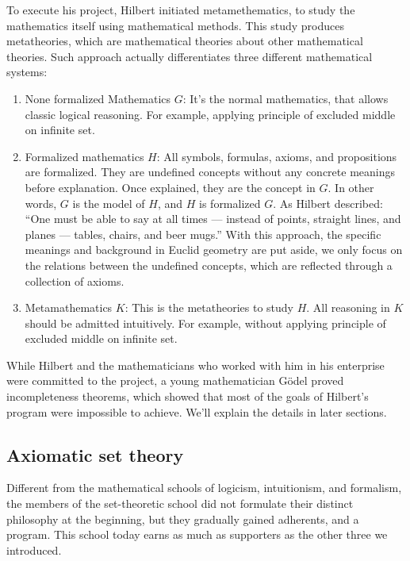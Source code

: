 \documentclass{article}
\begin{document}
To execute his project, Hilbert initiated metamethematics, to study the mathematics itself using mathematical methods. This study produces metatheories, which are mathematical theories about other mathematical theories. Such approach actually differentiates three different mathematical systems:

\begin{enumerate}
\item None formalized Mathematics $G$: It's the normal mathematics, that allows classic logical reasoning. For example, applying principle of excluded middle on infinite set.

\item Formalized mathematics $H$: All symbols, formulas, axioms, and propositions are formalized. They are undefined concepts without any concrete meanings before explanation. Once explained, they are the concept in $G$. In other words, $G$ is the model of $H$, and $H$ is formalized $G$. As Hilbert described: ``One must be able to say at all times — instead of points, straight lines, and planes — tables, chairs, and beer mugs.'' With this approach, the specific meanings and background in Euclid geometry are put aside, we only focus on the relations between the undefined concepts, which are reflected through a collection of axioms.

\item Metamathematics $K$: This is the metatheories to study $H$. All reasoning in $K$ should be admitted intuitively. For example, without applying principle of excluded middle on infinite set.
\end{enumerate}

While Hilbert and the mathematicians who worked with him in his enterprise were committed to the project, a young mathematician Gödel proved incompleteness theorems, which showed that most of the goals of Hilbert's program were impossible to achieve. We'll explain the details in later sections.

\subsection{Axiomatic set theory}

Different from the mathematical schools of logicism, intuitionism, and formalism, the members of the set-theoretic school did not formulate their distinct philosophy at the beginning, but they gradually gained adherents, and a program. This school today earns as much as supporters as the other three we introduced.
\end{document}
